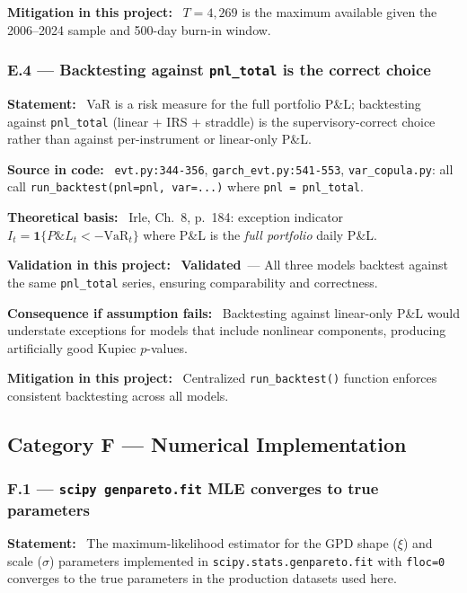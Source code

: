 \documentclass[11pt,a4paper]{article}
\newcommand{\asmfield}[1]{\medskip\noindent\textbf{#1:}\ }
\newcommand{\code}[1]{\texttt{#1}}
\newcommand{\validated}{\textbf{Validated}}
\begin{document}
\asmfield{Mitigation in this project}
$T = 4{,}269$ is the maximum available given the 2006--2024 sample and
500-day burn-in window.

\subsubsection{E.4 --- Backtesting against \texttt{pnl\_total} is the correct choice}\label{asm:E4}

\asmfield{Statement}
VaR is a risk measure for the full portfolio P\&L; backtesting against
\code{pnl\_total} (linear $+$ IRS $+$ straddle) is the supervisory-correct
choice rather than against per-instrument or linear-only P\&L.

\asmfield{Source in code}
\code{evt.py:344-356}, \code{garch\_evt.py:541-553}, \code{var\_copula.py}:
all call \code{run\_backtest(pnl=pnl, var=...)} where \code{pnl = pnl\_total}.

\asmfield{Theoretical basis}
Irle, Ch.~8, p.~184: exception indicator $I_t = \mathbf{1}\{P\&L_t <
-\text{VaR}_t\}$ where P\&L is the \emph{full portfolio} daily P\&L.

\asmfield{Validation in this project}
\validated\ --- All three models backtest against the same \code{pnl\_total}
series, ensuring comparability and correctness.

\asmfield{Consequence if assumption fails}
Backtesting against linear-only P\&L would understate exceptions for models
that include nonlinear components, producing artificially good Kupiec
$p$-values.

\asmfield{Mitigation in this project}
Centralized \code{run\_backtest()} function enforces consistent backtesting
across all models.

\subsection{Category F --- Numerical Implementation}\label{sec:catF}

\subsubsection{F.1 --- \texttt{scipy genpareto.fit} MLE converges to true parameters}\label{asm:F1}

\asmfield{Statement}
The maximum-likelihood estimator for the GPD shape ($\xi$) and scale
($\sigma$) parameters implemented in \code{scipy.stats.genpareto.fit}
with \code{floc=0} converges to the true parameters in the production
datasets used here.
\end{document}
